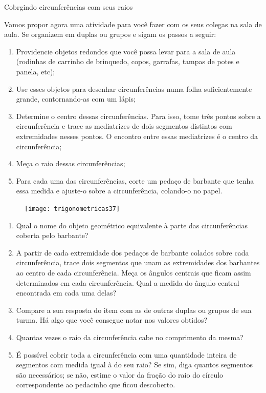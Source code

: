 \label{trig-exp2}

\begin{task}{Cobrgindo circunferências com seus raios}
\label{trig-ativ7}

Vamos propor agora uma atividade para você fazer com os seus colegas na sala de aula. Se organizem em duplas ou grupos e sigam os passos a seguir:
\begin{enumerate}[label=\titem{\arabic*.}]
\item Providencie objetos redondos que você possa levar para a sala de aula (rodinhas de carrinho de brinquedo, copos, garrafas, tampas de potes e panela, etc);
\item Use esses objetos para desenhar circunferências numa folha suficientemente grande, contornando-as com um lápis;
\item Determine o centro dessas circunferências. Para isso, tome três pontos sobre a circunferência e trace as mediatrizes de dois segmentos distintos com extremidades nesses pontos. O encontro entre essas mediatrizes é o centro da circunferência;
\item Meça o raio dessas circunferências;
\item Para cada uma das circunferências, corte um pedaço de barbante que tenha essa medida e ajuste-o sobre a circunferência, colando-o no papel.
\end{enumerate}

\begin{figure}[H]
\centering

\texttt{[image: trigonometricas37]}
\end{figure}

\begin{enumerate}
\item Qual o nome do objeto geométrico equivalente à parte das circunferências coberta pelo barbante?
\item A partir de cada extremidade dos pedaços de barbante colados sobre cada circunferência, trace dois segmentos que unam as extremidades dos barbantes ao centro de cada circunferência. Meça os ângulos centrais que ficam assim determinados em cada circunferência. Qual a medida do ângulo central encontrada em cada uma delas?
\item Compare a sua resposta do item  com as de outras duplas ou grupos de sua turma. Há algo que você consegue notar nos valores obtidos?
\item Quantas vezes o raio da circunferência cabe no comprimento da mesma?
\item É possível cobrir toda a circunferência com uma quantidade inteira de segmentos com medida igual à do seu raio? Se sim, diga quantos segmentos são necessários; se não, estime o valor da fração do raio do círculo correspondente ao pedacinho que ficou descoberto.
\end{enumerate}
\end{task}



